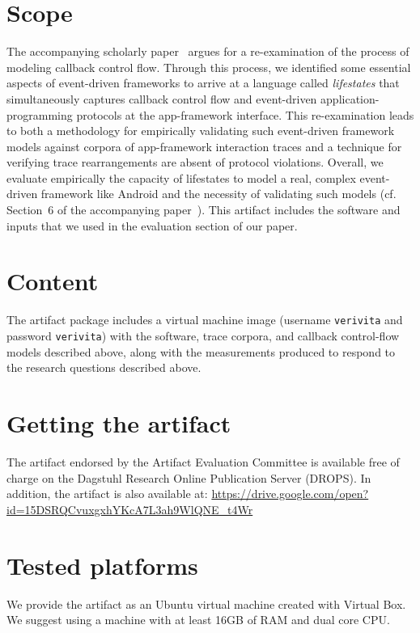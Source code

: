 \documentclass[a4paper,UKenglish]{darts-v2019}
\newenvironment{scope}{\section{Scope}}{}
\newenvironment{content}{\section{Content}}{}
\newenvironment{getting}{\section{Getting the artifact} The artifact
endorsed by the Artifact Evaluation Committee is available free of
charge on the Dagstuhl Research Online Publication Server (DROPS).}{}
\newenvironment{platforms}{\section{Tested platforms}}{}
\begin{document}
\begin{scope}
The accompanying scholarly paper~\cite{vervita-paper} argues for a re-examination of the process of modeling callback control flow. Through this process, we identified some essential aspects of event-driven frameworks to arrive at a language called \emph{lifestates} that simultaneously captures callback control flow and event-driven application-programming protocols at the app-framework interface. This re-examination leads to both a methodology for empirically validating such event-driven framework models against corpora of app-framework interaction traces and a technique for verifying trace rearrangements are absent of protocol violations. Overall, we evaluate empirically the capacity of lifestates to model a real, complex event-driven framework like Android and the necessity of validating such models (cf. Section~6 of the accompanying paper~\cite{vervita-paper}).
This artifact includes the software and inputs that we used in the evaluation section of our paper.

\end{scope}


\begin{content}
The artifact package includes a virtual machine image (username \texttt{verivita} and password \texttt{verivita}) with the software, trace corpora, and callback control-flow models described above, along with the measurements produced to respond to the research questions described above.
\end{content}

\begin{getting}
In addition, the artifact is also available at:
\url{https://drive.google.com/open?id=15DSRQCvuxgxhYKcA7L3ah9WlQNE_t4Wr}
\end{getting}

\begin{platforms}
We provide the artifact as an Ubuntu virtual machine created with Virtual Box.
We suggest using a machine with at least 16GB of RAM and dual core CPU.
\end{platforms}
\end{document}
